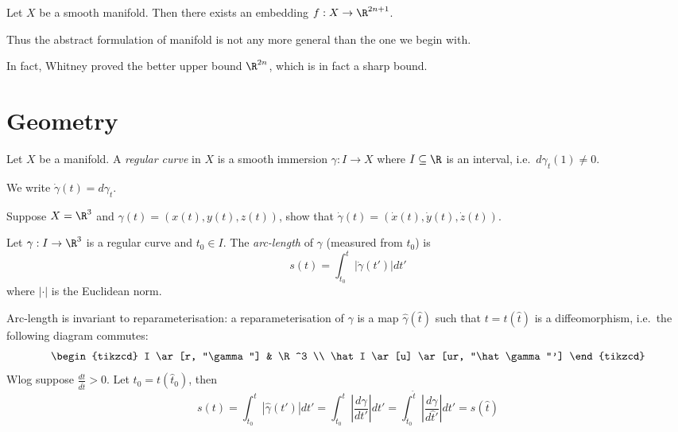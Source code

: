 \documentclass[a4paper]{article}
\begin{document}
\begin{theorem}
  Let \(X\) be a smooth manifold. Then there exists an embedding \(f: X \to \R^{2n + 1}\).
\end{theorem}

Thus the abstract formulation of manifold is not any more general than the one we begin with.

In fact, Whitney proved the better upper bound \(\R^{2n}\), which is in fact a sharp bound.

\section{Geometry}

\begin{definition}
  Let \(X\) be a manifold. A \emph{regular curve} in \(X\) is a smooth immersion \(\gamma: I \to X\) where \(I \subseteq \R\) is an interval, i.e.\ \(d\gamma_t(1) \neq 0\).
\end{definition}

\begin{notation}
  We write \(\dot \gamma(t) = d\gamma_t\).
\end{notation}

\begin{ex}
  Suppose \(X = \R^3\) and \(\gamma(t) = (x(t), y(t), z(t))\), show that \(\dot \gamma(t) = (\dot x(t), \dot y(t), \dot z(t))\).
\end{ex}

\begin{definition}
  Let \(\gamma: I \to \R^3\) is a regular curve and \(t_0 \in I\). The \emph{arc-length} of \(\gamma\) (measured from \(t_0\)) is
  \[
    s(t) = \int_{t_0}^t |\dot \gamma(t')| dt'
  \]
  where \(|\cdot|\) is the Euclidean norm.
\end{definition}

\begin{definition}
  Arc-length is invariant to reparameterisation: a reparameterisation of \(\gamma\) is a map \(\hat \gamma(\hat t)\) such that \(t = t(\hat t)\) is a diffeomorphism, i.e.\ the following diagram commutes:
  \[
    \begin{tikzcd}
      I \ar[r, "\gamma"] & \R^3 \\
      \hat I \ar[u] \ar[ur, "\hat \gamma"']
    \end{tikzcd}
  \]
  Wlog suppose \(\frac{dt}{d\hat t} > 0\). Let \(t_0 = t(\hat t_0)\), then
  \[
    s(t)
    = \int_{t_0}^t |\hat \gamma(t')| dt'
    = \int_{t_0}^t \left| \frac{d\gamma}{dt'} \right| dt'
    = \int_{\hat t_0}^{\hat t} \left| \frac{d\gamma}{d\hat t'} \right| dt'
    = s(\hat t)
  \]
\end{definition}
\end{document}
